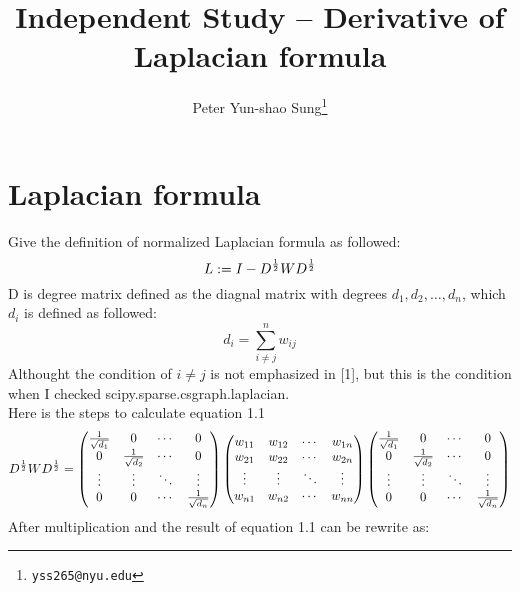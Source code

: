 \documentclass[final]{siamltexmm}
\title{Independent Study -- Derivative of Laplacian formula}
\author{Peter Yun-shao Sung\thanks{\tt yss265@nyu.edu} }
\begin{document}
\maketitle

\pagestyle{myheadings}
\thispagestyle{plain}

\section{Laplacian formula}
Give the definition of normalized Laplacian formula as followed:
\begin{equation}
L := I - D^{1 \over 2}W D^{1 \over 2}
\end{equation}
D is degree matrix defined as the diagnal matrix with degrees $d_1, d_2, \ldots, d_n$, which $d_i$ is defined as followed:
\begin{equation}
d_i = \displaystyle\sum_{i \neq j}^{n} w_{ij}
\end{equation}
Althought the condition of $i \neq j$ is not emphasized in [1], but this is the condition when I checked scipy.sparse.csgraph.laplacian.\\
Here is the steps to calculate equation 1.1
\begin{equation}
D^{1 \over 2}W D^{1 \over 2} =
\begin{pmatrix}
  {1 \over \sqrt{d_1}} & 0 & \cdots & 0 \\
  0 & {1 \over \sqrt{d_2}} & \cdots & 0 \\
  \vdots  & \vdots  & \ddots & \vdots  \\
  0 & 0 & \cdots & {1 \over \sqrt{d_n}}
\end{pmatrix}
\begin{pmatrix}
  w_{11} & w_{12} & \cdots & w_{1n} \\
  w_{21} & w_{22} & \cdots & w_{2n} \\
  \vdots  & \vdots  & \ddots & \vdots  \\
  w_{n1} & w_{n2} & \cdots & w_{nn}
\end{pmatrix}
\begin{pmatrix}
  {1 \over \sqrt{d_1}} & 0 & \cdots & 0 \\
  0 & {1 \over \sqrt{d_2}} & \cdots & 0 \\
  \vdots  & \vdots  & \ddots & \vdots  \\
  0 & 0 & \cdots & {1 \over \sqrt{d_n}}
\end{pmatrix}
\end{equation}
After multiplication and the result of equation 1.1 can be rewrite as:
\end{document}
